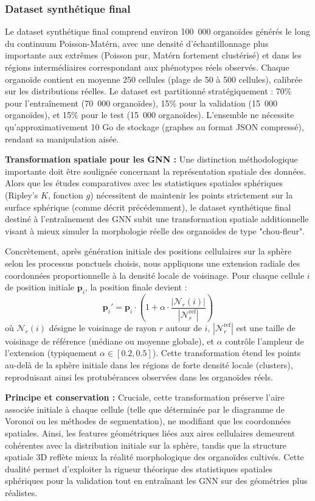\subsubsection{Dataset synthétique final}
\label{sec:dataset_final}

Le dataset synthétique final comprend environ 100~000 organoïdes générés le long du continuum Poisson-Matérn, avec une densité d'échantillonnage plus importante aux extrêmes (Poisson pur, Matérn fortement clustérisé) et dans les régions intermédiaires correspondant aux phénotypes réels observés. Chaque organoïde contient en moyenne 250 cellules (plage de 50 à 500 cellules), calibrée sur les distributions réelles. Le dataset est partitionné stratégiquement : 70\% pour l'entraînement (70~000 organoïdes), 15\% pour la validation (15~000 organoïdes), et 15\% pour le test (15~000 organoïdes). L'ensemble ne nécessite qu'approximativement 10 Go de stockage (graphes au format JSON compressé), rendant sa manipulation aisée.

\textbf{Transformation spatiale pour les GNN :}
Une distinction méthodologique importante doit être soulignée concernant la représentation spatiale des données. Alors que les études comparatives avec les statistiques spatiales sphériques (Ripley's $K$, fonction $g$) nécessitent de maintenir les points strictement sur la surface sphérique (comme décrit précédemment), le dataset synthétique final destiné à l'entraînement des GNN subit une transformation spatiale additionnelle visant à mieux simuler la morphologie réelle des organoïdes de type "chou-fleur".

Concrètement, après génération initiale des positions cellulaires sur la sphère selon les processus ponctuels choisis, nous appliquons une extension radiale des coordonnées proportionnelle à la densité locale de voisinage. Pour chaque cellule $i$ de position initiale $\mathbf{p}_i$, la position finale devient :
\[
\mathbf{p}_i' = \mathbf{p}_i \cdot \left(1 + \alpha \cdot \frac{|\mathcal{N}_r(i)|}{|\mathcal{N}_r^{\text{ref}}|}\right)
\]
où $\mathcal{N}_r(i)$ désigne le voisinage de rayon $r$ autour de $i$, $|\mathcal{N}_r^{\text{ref}}|$ est une taille de voisinage de référence (médiane ou moyenne globale), et $\alpha$ contrôle l'ampleur de l'extension (typiquement $\alpha \in [0.2, 0.5]$). Cette transformation étend les points au-delà de la sphère initiale dans les régions de forte densité locale (clusters), reproduisant ainsi les protubérances observées dans les organoïdes réels.

\textbf{Principe et conservation :}
Cruciale, cette transformation préserve l'aire associée initiale à chaque cellule (telle que déterminée par le diagramme de Voronoï ou les méthodes de segmentation), ne modifiant que les coordonnées spatiales. Ainsi, les features géométriques liées aux aires cellulaires demeurent cohérentes avec la distribution initiale sur la sphère, tandis que la structure spatiale 3D reflète mieux la réalité morphologique des organoïdes cultivés. Cette dualité permet d'exploiter la rigueur théorique des statistiques spatiales sphériques pour la validation tout en entraînant les GNN sur des géométries plus réalistes.

